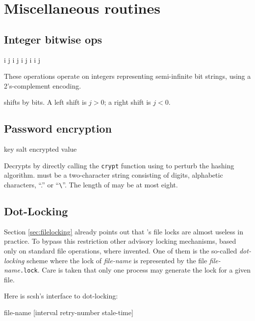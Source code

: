 
\chapter{Miscellaneous routines}

\section{Integer bitwise ops}
\label{sec:bitwise}
 {i j} \integer
{} {i j} \integer
{} {i j} \integer
{} {i} \integer
{} {i j} \integer
\begin{desc}
    These operations operate on integers representing semi-infinite 
    bit strings, using a 2's-complement encoding.

     shifts  by  bits. 
    A left shift is $j > 0$; a right shift is $j < 0$.
\end{desc}

\section{Password encryption}

 {key salt} {encrypted value}

Decrypts  by directly calling the \texttt{crypt} function
using  to perturb the hashing algorithm.  must be
a two-character string consisting of digits, alphabetic characters,
``.'' or ``\verb+\+''. The length of  may be at most eight.

\section{Dot-Locking}
Section \ref{sec:filelocking} already points out that {\Posix}'s file
locks are almost useless in practice. To bypass this restriction other
advisory locking mechanisms, based only on standard file operations,
where invented. One of them is the so-called \emph{dot-locking} scheme
where the lock of \textit{file-name} is represented by the file
\textit{file-name}\texttt{.lock}. Care is taken that only one process
may generate the lock for a given file.

Here is scsh's interface to dot-locking:

 {file-name [interval retry-number stale-time]} {\boolean}

